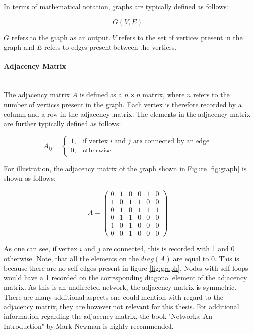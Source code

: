 	\noindent In terms of mathematical notation, graphs are typically defined
	as follows:

	\begin{equation}
		G(V,E)
	\end{equation}

	\noindent $G$ refers to the graph as an output. $V$ refers to the set of 
	vertices present in the graph and $E$ refers to edges present between the 
	vertices.

	\paragraph{Adjacency Matrix} \mbox{}\\  

	\noindent The adjacency matrix $A$ is defined as a $n \times n$ matrix, 
	where $n$ refers to the number of vertices present in the graph. Each 
	vertex is therefore recorded by a column and a row in the adjacency matrix. 
	The elements in the adjacency matrix are further typically defined as follows:

	\begin{equation}
		A_{ij} = 
			\begin{cases}
				1, & \text{if vertex $i$ and $j$ are connected by an edge} \\
				0, & \text{otherwise}
			\end{cases}
	\end{equation}
	
	\noindent For illustration, the adjacency matrix of the graph shown in 
	Figure \ref{fig:graph} is shown as follows:

	\[ A = 
	\begin{pmatrix}
		0 & 1 & 0 & 0 & 1 & 0 \\
		1 & 0 & 1 & 1 & 0 & 0 \\
		0 & 1 & 0 & 1 & 1 & 1 \\
		0 & 1 & 1 & 0 & 0 & 0 \\
		1 & 0 & 1 & 0 & 0 & 0 \\
		0 & 0 & 1 & 0 & 0 & 0  
	\end{pmatrix}
	\] 
	
	\noindent As one can see, if vertex $i$ and $j$ are connected, this is recorded with
	1 and 0 otherwise. Note, that all the elements on the $diag(A)$ are equal
	to 0. This is because there are no self-edges present in figure
	\ref{fig:graph}. Nodes with self-loops would have a 1 recorded on the
	corresponding diagonal element of the adjacency matrix. As this is an 
	undirected network, the adjacency matrix is symmetric. There are many 
	additional aspects one could mention with regard to the adjacency matrix, 
	they are however not relevant for this thesis. For additional information 
	regarding the adjacency matrix, the book "Networks: An Introduction" by 
	Mark Newman \citeyearpar{Newman2010} is highly recommended. 

